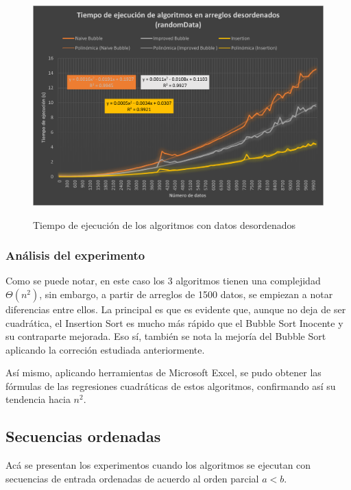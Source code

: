 \documentclass[letter]{article}
\begin{document}
\begin{figure}[h]
    \centering
    \includegraphics[scale=0.90]{randomDataGraphic.png}
    \label{experimentos:aleatorias:grafica}
    \caption{Tiempo de ejecución de los algoritmos con datos desordenados}
\end{figure}

\subsubsection{Análisis del experimento}
\label{experimentos:aleatorias:analisis}
Como se puede notar, en este caso los 3 algoritmos tienen una complejidad $\Theta(n^{2})$, sin embargo, a partir de arreglos de 1500 datos, se empiezan a notar diferencias entre ellos. La principal es que es evidente que, aunque no deja de ser cuadrática, el Insertion Sort es mucho más rápido que el Bubble Sort Inocente y su contraparte mejorada. Eso sí, también se nota la mejoría del Bubble Sort aplicando la correción estudiada anteriormente.

Así mismo, aplicando herramientas de Microsoft Excel, se pudo obtener las fórmulas de las regresiones cuadráticas de estos algoritmos, confirmando así su tendencia hacia $n^2$.

\subsection{Secuencias ordenadas} \label{experimentos:ordenadas}

Acá se presentan los experimentos cuando los algoritmos se ejecutan con secuencias de entrada ordenadas de acuerdo al orden parcial $a<b$.
\end{document}
